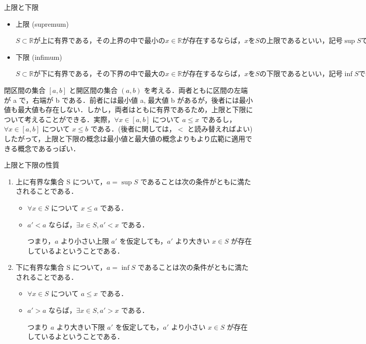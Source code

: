 \documentclass[a4paper, platex,dvipdfmx]{jlreq}			%
\begin{document}
\pagebreak

\begin{mytcb}{上限と下限}{}
\begin{itemize}
\item 上限 (supremum)

\begin{math}
S \subset \mathbb{R} が上に有界である，その上界の中で最小の x \in \mathbb{R} が存在するならば， x を S の上限であるといい，記号 \sup S で表す．つまり，U(S) があって \min U(S) が存在するならば，それを \sup S と表す．
\end{math}
\item 下限 (infimum)

\begin{math}
S \subset \mathbb{R} が下に有界である，その下界の中で最大の x \in \mathbb{R} が存在するならば，x を S の下限であるといい，記号 \inf S で表す．つまり L(S) をもつとき，\max L(S)  が存在するならば，それを \inf S と表す．
\end{math}
\end{itemize}
\end{mytcb}

閉区間の集合 $[a, b]$ と開区間の集合 $(a, b)$ を考える．両者ともに区間の左端が a で，右端が b である．前者には最小値 a, 最大値 b があるが，後者には最小値も最大値も存在しない．しかし，両者はともに有界であるため，上限と下限について考えることができる．実際，$\forall x \in [a, b]$ について $ a \leq x$ であるし，$\forall x \in [a, b]$ について $x \leq b$ である．(後者に関しては，$<$ と読み替えればよい) \\ したがって，上限と下限の概念は最小値と最大値の概念よりもより広範に適用できる概念であるっぽい．

\begin{mytcb}{上限と下限の性質}{}

\begin{enumerate}
\item 上に有界な集合 S について，$a = \sup S$ であることは次の条件がともに満たされることである．
\begin{itemize}
\item[(a) ] $\forall x \in S$ について $x \leq a$ である．
\item[(b) ] $a' < a$ ならば，$\exists x \in S, a' < x$ である．

つまり，$a$ より小さい上限 $a'$ を仮定しても，$a'$ より大きい $x \in S$ が存在しているよということである．
\end{itemize}
\item 下に有界な集合 S について，$a = \inf S$ であることは次の条件がともに満たされることである．
\begin{itemize}
\item[(a) ] $\forall x \in S$ について $a \leq x$ である．
\item[(b) ] $a' > a$ ならば，$\exists x \in S, a' > x$ である．

つまり $a$ より大きい下限 $a'$ を仮定しても，$a'$ より小さい $x \in S$ が存在しているよということである．
\end{itemize}
\end{enumerate}

\end{mytcb}
\end{document}

